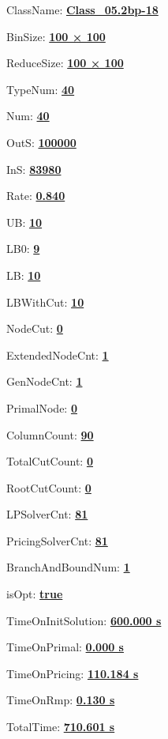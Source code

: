 \documentclass[11pt]{article}
\begin{document}
\pagestyle{empty}


ClassName: \underline{\textbf{Class_05.2bp-18}}
\par
BinSize: \underline{\textbf{100 × 100}}
\par
ReduceSize: \underline{\textbf{100 × 100}}
\par
TypeNum: \underline{\textbf{40}}
\par
Num: \underline{\textbf{40}}
\par
OutS: \underline{\textbf{100000}}
\par
InS: \underline{\textbf{83980}}
\par
Rate: \underline{\textbf{0.840}}
\par
UB: \underline{\textbf{10}}
\par
LB0: \underline{\textbf{9}}
\par
LB: \underline{\textbf{10}}
\par
LBWithCut: \underline{\textbf{10}}
\par
NodeCut: \underline{\textbf{0}}
\par
ExtendedNodeCnt: \underline{\textbf{1}}
\par
GenNodeCnt: \underline{\textbf{1}}
\par
PrimalNode: \underline{\textbf{0}}
\par
ColumnCount: \underline{\textbf{90}}
\par
TotalCutCount: \underline{\textbf{0}}
\par
RootCutCount: \underline{\textbf{0}}
\par
LPSolverCnt: \underline{\textbf{81}}
\par
PricingSolverCnt: \underline{\textbf{81}}
\par
BranchAndBoundNum: \underline{\textbf{1}}
\par
isOpt: \underline{\textbf{true}}
\par
TimeOnInitSolution: \underline{\textbf{600.000 s}}
\par
TimeOnPrimal: \underline{\textbf{0.000 s}}
\par
TimeOnPricing: \underline{\textbf{110.184 s}}
\par
TimeOnRmp: \underline{\textbf{0.130 s}}
\par
TotalTime: \underline{\textbf{710.601 s}}
\par
\newpage


\end{document}
